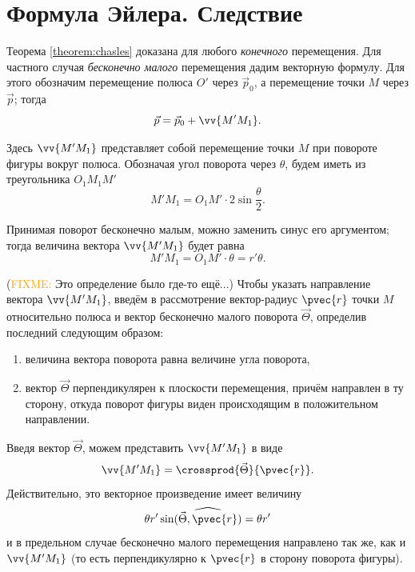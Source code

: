 \section{Формула Эйлера. Следствие}

Теорема \ref{theorem:chasles} доказана для любого \textit{конечного}
перемещения. Для частного случая \textit{бесконечно малого} перемещения дадим
векторную формулу. Для этого обозначим перемещение полюса $O'$ через
$\vec{p}_0$, а перемещение точки $M$ через $\vec{p}$; тогда
\begin{equation}
  \label{eq:flat_figure_movement_temp}
  \vec{p} = \vec{p}_0 + \vv{M' M_1}.
\end{equation}

Здесь $\vv{M' M_1}$ представляет собой перемещение точки $M$ при повороте фигуры
вокруг полюса. Обозначая угол поворота через $\theta$, будем иметь из
треугольника $O_1 M_1 M'$
\begin{equation*}
  M' M_1 = O_1 M' \cdot 2 \sin \frac{\theta}{2}.
\end{equation*}

Принимая поворот бесконечно малым, можно заменить синус его аргументом; тогда
величина вектора $\vv{M' M_1}$ будет равна
\begin{equation*}
  M' M_1 = O_1 M' \cdot \theta = r' \theta.
\end{equation*}

(\textcolor{orange}{FIXME:} Это определение было где-то ещё...)
Чтобы указать направление вектора $\vv{M' M_1}$, введём в рассмотрение
вектор-радиус $\pvec{r}$ точки $M$ относительно полюса и вектор бесконечно
малого поворота $\vec{\Theta}$, определив последний следующим образом:
\begin{enumerate}
  \item величина вектора поворота равна величине угла поворота,
  \item вектор $\vec{\Theta}$ перпендикулярен к плоскости перемещения, причём
    направлен в ту сторону, откуда поворот фигуры виден происходящим в
    положительном направлении.
\end{enumerate}

Введя вектор $\vec{\Theta}$, можем представить $\vv{M'M_1}$ в виде
\begin{equation*}
  \vv{M' M_1} = \crossprod{\vec{\Theta}}{\pvec{r}}.
\end{equation*}
Действительно, это векторное произведение имеет величину
\begin{equation*}
  \theta r' \sin(\widehat{\vec{\Theta}, \pvec{r}}) = \theta r'
\end{equation*}
и в предельном случае бесконечно малого перемещения направлено так же, как и
$\vv{M' M_1}$ (то есть перпендикулярно к $\pvec{r}$ в сторону поворота фигуры).

